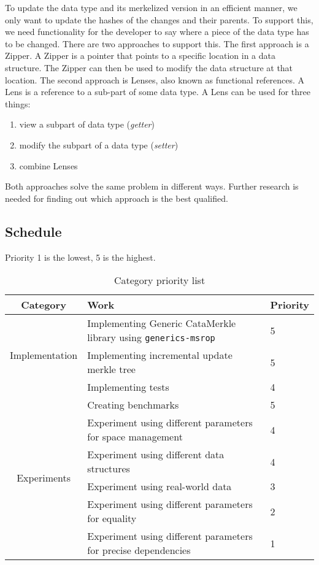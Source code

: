 To update the data type and its merkelized version in an efficient manner, we only want to update the hashes of the changes and their parents. To support this, we need functionality for the developer to say where a piece of the data type has to be changed. There are two approaches to support this. The first approach is a Zipper\cite{huet1997zipper}. A Zipper is a pointer that points to a specific location in a data structure. The Zipper can then be used to modify the data structure at that location. The second approach is Lenses\cite{steckermeier2015lenses}, also known as functional references. A Lens is a reference to a sub-part of some data type. A Lens can be used for three things: 
\begin{enumerate}
    \item view a subpart of data type (\textit{getter})
    \item modify the subpart of a data type (\textit{setter})
    \item combine Lenses
\end{enumerate}
Both approaches solve the same problem in different ways. Further research is needed for finding out which approach is the best qualified. 

\newpage
\subsection{Schedule}

Priority 1 is the lowest, 5 is the highest.
\begin{table}[H]
    \setlength{\tabcolsep}{8pt}
    \centering
    \small
    \bigskip
    \begin{tabular}{|c|l|l|}
        \hline
        Category & Work & Priority \\
        \hline
        \multirow{3}{7em}{Implementation} & Implementing Generic CataMerkle library using \texttt{generics-msrop} & 5 \\
         & Implementing incremental update merkle tree & 5 \\
         & Implementing tests & 4 \\
        \hline
        \multirow{6}{7em}{Experiments} & Creating benchmarks & 5 \\
         & Experiment using different parameters for space management & 4 \\
         & Experiment using different data structures & 4 \\
         & Experiment using real-world data & 3 \\
         & Experiment using different parameters for equality & 2 \\
         & Experiment using different parameters for precise dependencies & 1 \\
        \hline
    \end{tabular}
\caption{Category priority list}
\label{table:priorities}
\end{table}

